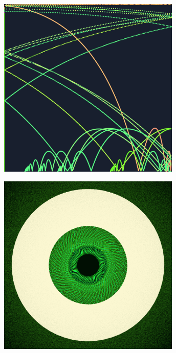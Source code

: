 \documentclass[11pt,twoside]{book}
\begin{document}
\begin{figure}[!ht]
\includegraphics[width=246pt]{candy-d4112a91-964a-4f90-9531-e332df7e4010.png}
\end{figure}
\newpage
{}
\fancyfoot[CE,CO]{\fontsize{10}{12}\selectfont \thepage}
\begin{figure}[!ht]
\includegraphics[width=246pt]{lime-fd2ef661-2044-4580-baab-f5fac9ad50c3.png}
\end{figure}
\newpage
{}
\fancyfoot[CE,CO]{\fontsize{10}{12}\selectfont \thepage}
\end{document}

